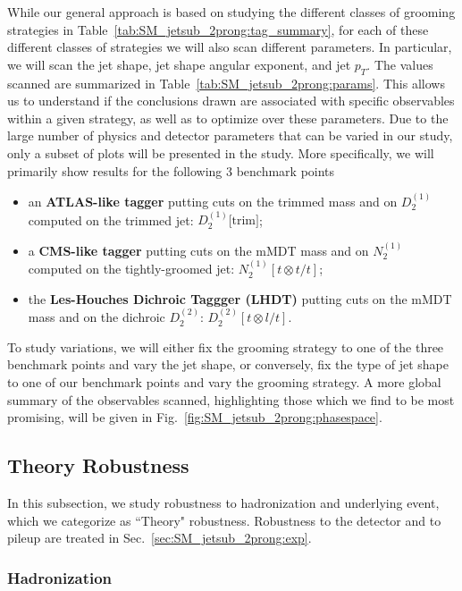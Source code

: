 While our general approach is based on studying the different classes of grooming strategies in Table~\ref{tab:SM_jetsub_2prong:tag_summary}, for each of these different classes of strategies we will also scan different parameters.
%
In particular, we will scan the jet shape, jet shape angular exponent, and jet $p_T$.
%
The values scanned are summarized in Table~\ref{tab:SM_jetsub_2prong:params}.
%
This allows us to understand if the conclusions drawn are associated with specific observables within a given strategy, as well as to optimize over these parameters.
%
Due to the large number of physics and detector parameters that can be
varied in our study, only a subset of plots will be presented in the
study. More specifically, we will primarily show results for the
following 3 benchmark points
%
\begin{itemize}
%
\item an {\bf ATLAS-like tagger} putting cuts on the trimmed mass and
on $D_2^{(1)}$ computed on the trimmed jet: $D_2^{(1)}\text{[trim]}$;
%
\item a {\bf CMS-like tagger} putting cuts on the mMDT mass and on
$N_2^{(1)}$ computed on the tightly-groomed jet: $N_2^{(1)}[t\otimes t/t]$;
%
\item the {\bf Les-Houches Dichroic Taggger (LHDT)} putting cuts on
  the mMDT mass and on the dichroic $D_2^{(2)}$:
  $D_2^{(2)}[t\otimes l/t]$.
%
\end{itemize}
%
To study variations, we will either fix the grooming strategy to one
of the three benchmark points and vary the jet shape, or conversely,
fix the type of jet shape to one of our benchmark points and vary the
grooming strategy.
%
A more global summary of the observables scanned, highlighting those
which we find to be most promising, will be given in
Fig.~\ref{fig:SM_jetsub_2prong:phasespace}.

\subsection{Theory Robustness}\label{sec:SM_jetsub_2prong:np}


In this subsection, we study robustness to hadronization and underlying event, which we categorize as ``Theory" robustness. Robustness to the detector and to pileup are treated in Sec.~\ref{sec:SM_jetsub_2prong:exp}. 


\subsubsection{Hadronization}\label{sec:SM_jetsub_2prong:hadr}

